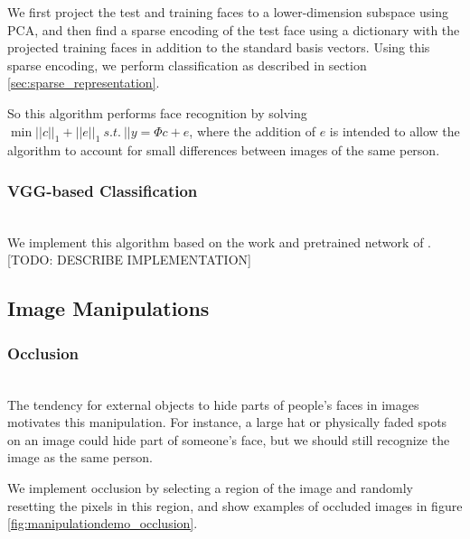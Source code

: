 \documentclass[pageno]{cos429}
\begin{document}
We first project the test and training faces to a lower-dimension subspace using PCA, and then find a sparse encoding of the test face using a dictionary with the projected training faces in addition to the standard basis vectors. Using this sparse encoding, we perform classification as described in section \ref{sec:sparse_representation}.

So this algorithm performs face recognition by solving $\min||c||_1+||e||_1\:s.t.\:||y=\Phi c+e$, where the addition of $e$ is intended to allow the algorithm to account for small differences between images of the same person.

\subsubsection{VGG-based Classification}\hspace*{\fill} \\
We implement this algorithm based on the work and pretrained network of \cite{parkhi_deep_2015}.
[TODO: DESCRIBE IMPLEMENTATION]

\subsection{Image Manipulations}

\subsubsection{Occlusion}\hspace*{\fill} \\
The tendency for external objects to hide parts of people's faces in images motivates this manipulation. For instance, a large hat or physically faded spots on an image could hide part of someone's face, but we should still recognize the image as the same person.

We implement occlusion by selecting a region of the image and randomly resetting the pixels in this region, and show examples of occluded images in figure \ref{fig:manipulationdemo_occlusion}.
\end{document}
